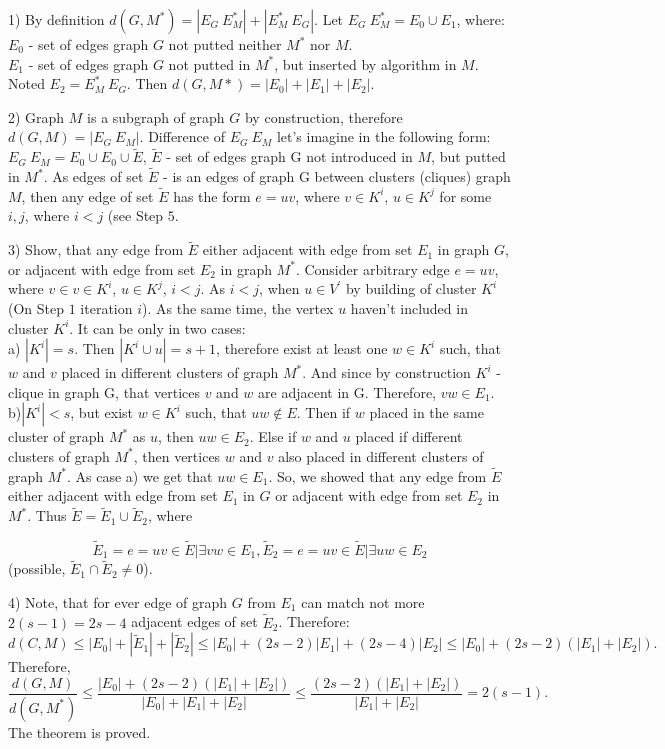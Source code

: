 \documentclass[12pt]{article}
\begin{document}
1) By definition $d(G,M^*) = |E_G \ E_M^*| + |E_M^* \ E_G|$.
Let $E_G \ E_M^* = E_0 \cup E_1$, where:
\\ $E_0$ - set of edges graph $G$ not putted neither $M^*$ nor $M$.
\\ $E_1$ - set of edges graph $G$ not putted in $M^*$, but inserted by algorithm in $M$.
\\ Noted $E_2 = E_M^* \ E_G$. Then $d(G,M*) = |E_0| + |E_1| + |E_2|$.

2) Graph $M$ is a subgraph of graph $G$ by construction, therefore $d(G,M) = |E_G \ E_M|$.
Difference of $E_G \ E_M$ let's imagine in the following form: $E_G \ E_M = E_0\cup E_0\cup \tilde{E}$, $\tilde{E}$ - set of edges graph G not introduced in $M$, but putted  in $M^*$. As edges of set $\tilde{E}$ - is an edges of graph G between clusters (cliques) graph $M$, then any edge of set $\tilde{E}$ has the form $e = uv$, where $v \in K^i$, $u \in K^j$ for some $i,j$, where $ i < j $ (see Step $5$.

3) Show, that any edge from $\tilde{E}$ either adjacent with edge from set $E_1$ in graph $G$, or adjacent with edge from set $E_2$ in graph $M^*$.
Consider arbitrary edge $e = uv$, where $v\in v\in K^i$, $u \in K^j$, $i < j$. As $i < j$, when $u \in V^{'}$ by building of cluster $K^i$ (On Step $1$ iteration $i$). As the same time, the vertex $u$ haven't included in cluster $K^i$. It can be only in two cases:
\\a) $|K^i| = s$. Then $|K^i \cup u| = s + 1$, therefore exist at least one $w \in K^i$ such, that $w$ and $v$ placed in different clusters of graph $M^*$. And since by construction $K^i$ - clique in graph G, that vertices $v$ and $w$ are adjacent in G. Therefore, $vw \in E_1$.
\\b)$|K^i| < s$, but exist $w \in K^i$ such, that $uw \notin E$. Then if $w$ placed in the same cluster of graph $M^*$ as $u$, then $uw\in E_2$. Else if $w$ and $u$ placed if different clusters of graph $M^*$, then vertices $w$ and $v$ also placed in different clusters of graph $M^*$. As case a) we get that $uw \in E_1$.
So, we showed that any edge from $\tilde{E}$ either adjacent with edge from set $E_1$ in $G$ or adjacent with edge from set $E_2$ in $M^*$. Thus $\tilde{E} = \tilde{E}_1 \cup \tilde{E}_2$, where

$$
\tilde{E}_1 = { e = uv \in \tilde{E} | \exists vw\in E_1}, \tilde{E}_2 = {e = uv \in \tilde{E}|\exists uw\in E_2}
$$
(possible, $\tilde{E}_1 \cap \tilde{E}_2 \neq 0$).

4) Note, that for ever edge of graph $G$ from $E_1$ can match not more $2(s-1) = 2s - 4$ adjacent edges of set $\tilde{E}_2$. Therefore:
$$
d(C,M) \leq |E_0| + |\tilde{E}_1| + |\tilde{E}_2| \leq |E_0| + (2s-2)|E_1| + (2s-4)|E_2| \leq |E_0|+(2s-2)(|E_1| + |E_2|).
$$
Therefore,
$$
\frac{d(G,M)}{d(G,M^*)} \leq \frac{|E_0| + (2s-2)(|E_1| + |E_2|)}{|E_0| + |E_1| + |E_2|} \leq \frac{(2s-2)(|E_1|+|E_2|)}{|E_1| + |E_2|} = 2(s-1).
$$
The theorem is proved.
\end{document}
